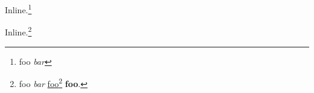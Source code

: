 
\def\mytitle{Inline Footnotes}


Inline.\footnote{foo \emph{bar}}

Inline.\footnote{foo \emph{bar}
\href{/bar}{foo}\footnote{\href{/bar}{\slash bar}}
\textbf{foo}.}



